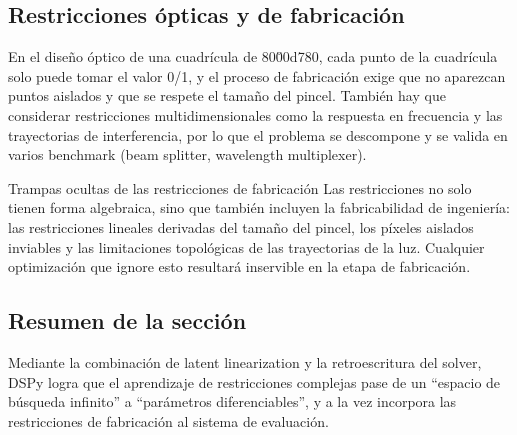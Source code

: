 \subsection{Restricciones ópticas y de fabricación}

En el diseño óptico de una cuadrícula de 80\u00d780, cada punto de la cuadrícula solo puede tomar el valor 0/1, y el proceso de fabricación exige que no aparezcan puntos aislados y que se respete el tamaño del pincel. También hay que considerar restricciones multidimensionales como la respuesta en frecuencia y las trayectorias de interferencia, por lo que el problema se descompone y se valida en varios benchmark (beam splitter, wavelength multiplexer).
\begin{warningbox}{Trampas ocultas de las restricciones de fabricación}
Las restricciones no solo tienen forma algebraica, sino que también incluyen la fabricabilidad de ingeniería: las restricciones lineales derivadas del tamaño del pincel, los píxeles aislados inviables y las limitaciones topológicas de las trayectorias de la luz. Cualquier optimización que ignore esto resultará inservible en la etapa de fabricación.
\end{warningbox}

\subsection{Resumen de la sección}

Mediante la combinación de latent linearization y la retroescritura del solver, DSPy logra que el aprendizaje de restricciones complejas pase de un ``espacio de búsqueda infinito'' a ``parámetros diferenciables'', y a la vez incorpora las restricciones de fabricación al sistema de evaluación.

